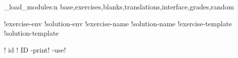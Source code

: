 % 
% 
% 
% 
% 

\xsim_load_modules:n {base,exercises,blanks,translations,interface,grades,random}

\DeclareExerciseParameter*!{exercise-env}
\DeclareExerciseParameter*!{solution-env}
\DeclareExerciseParameter !{exercise-name}
\DeclareExerciseParameter !{solution-name}
\DeclareExerciseParameter !{exercise-template}
\DeclareExerciseParameter !{solution-template}


\DeclareExerciseProperty!  {id}
\DeclareExerciseProperty!  {ID}
\DeclareExerciseProperty *-{print!}
\DeclareExerciseProperty *-{use!}

